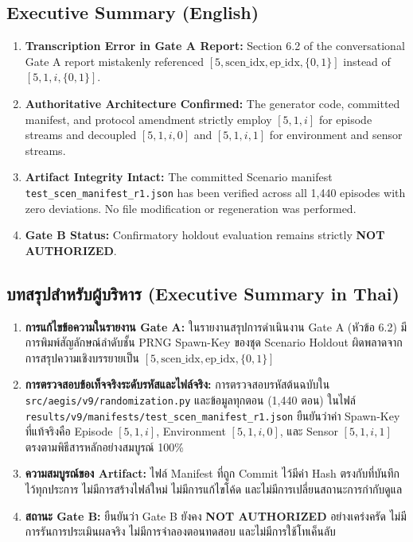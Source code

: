\documentclass[10pt,a4paper]{article}
\begin{document}
\subsection{Executive Summary (English)}
\begin{enumerate}
    \item \textbf{Transcription Error in Gate A Report:} Section 6.2 of the conversational Gate A report mistakenly referenced $[5, \text{scen\_idx}, \text{ep\_idx}, \{0, 1\}]$ instead of $[5, 1, i, \{0, 1\}]$.
    \item \textbf{Authoritative Architecture Confirmed:} The generator code, committed manifest, and protocol amendment strictly employ $[5, 1, i]$ for episode streams and decoupled $[5, 1, i, 0]$ and $[5, 1, i, 1]$ for environment and sensor streams.
    \item \textbf{Artifact Integrity Intact:} The committed Scenario manifest \texttt{test\_scen\_manifest\_r1.json} has been verified across all 1,440 episodes with zero deviations. No file modification or regeneration was performed.
    \item \textbf{Gate B Status:} Confirmatory holdout evaluation remains strictly \textbf{NOT AUTHORIZED}.
\end{enumerate}

\subsection{\thaifont บทสรุปสำหรับผู้บริหาร (Executive Summary in Thai)}
\begin{enumerate}
    \item \textbf{\thaifont การแก้ไขข้อความในรายงาน Gate A:} \thaifont ในรายงานสรุปการดำเนินงาน Gate A (หัวข้อ 6.2) มีการพิมพ์สัญลักษณ์ลำดับชั้น PRNG Spawn-Key ของชุด Scenario Holdout ผิดพลาดจากการสรุปความเชิงบรรยายเป็น $[5, \text{scen\_idx}, \text{ep\_idx}, \{0, 1\}]$
    \item \textbf{\thaifont การตรวจสอบข้อเท็จจริงระดับรหัสและไฟล์จริง:} \thaifont การตรวจสอบรหัสต้นฉบับใน \texttt{src/aegis/v9/randomization.py} และข้อมูลทุกตอน (1,440 ตอน) ในไฟล์ \texttt{results/v9/manifests/test\_scen\_manifest\_r1.json} ยืนยันว่าค่า Spawn-Key ที่แท้จริงคือ Episode $[5, 1, i]$, Environment $[5, 1, i, 0]$, และ Sensor $[5, 1, i, 1]$ ตรงตามพิธีสารหลักอย่างสมบูรณ์ 100\%
    \item \textbf{\thaifont ความสมบูรณ์ของ Artifact:} \thaifont ไฟล์ Manifest ที่ถูก Commit ไว้มีค่า Hash ตรงกับที่บันทึกไว้ทุกประการ ไม่มีการสร้างไฟล์ใหม่ ไม่มีการแก้ไขโค้ด และไม่มีการเปลี่ยนสถานะการกำกับดูแล
    \item \textbf{\thaifont สถานะ Gate B:} \thaifont ยืนยันว่า Gate B ยังคง \textbf{NOT AUTHORIZED} อย่างเคร่งครัด ไม่มีการรันการประเมินผลจริง ไม่มีการจำลองตอนทดสอบ และไม่มีการใช้โทเค็นลับ
\end{enumerate}
\end{document}
